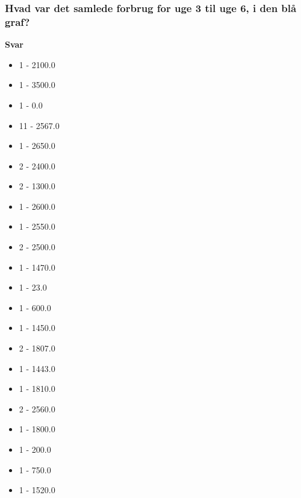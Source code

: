 \subsubsection{Hvad var det samlede forbrug for uge 3 til uge 6, i den blå graf?}
\textbf{Svar}
\begin{itemize}
    \item 1 - 2100.0
    \item 1 - 3500.0
    \item 1 - 0.0
    \item 11 - 2567.0
    \item 1 - 2650.0
    \item 2 - 2400.0
    \item 2 - 1300.0
    \item 1 - 2600.0
    \item 1 - 2550.0
    \item 2 - 2500.0
    \item 1 - 1470.0
    \item 1 - 23.0
    \item 1 - 600.0
    \item 1 - 1450.0
    \item 2 - 1807.0
    \item 1 - 1443.0
    \item 1 - 1810.0
    \item 2 - 2560.0
    \item 1 - 1800.0
    \item 1 - 200.0
    \item 1 - 750.0
    \item 1 - 1520.0
\end{itemize}

